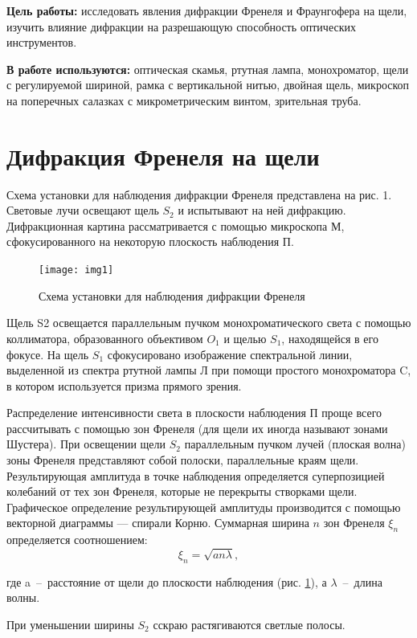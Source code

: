 \documentclass{letask}
\begin{document}


\textbf{Цель работы:} исследовать явления дифракции Френеля и Фраунгофера на щели, изучить влияние дифракции на разрешающую способность оптических инструментов.

\textbf{В работе используются:} оптическая скамья, ртутная лампа, монохроматор, щели с регулируемой шириной, рамка с вертикальной нитью, двойная щель, микроскоп на поперечных салазках с микрометрическим винтом, зрительная труба.

\section{Дифракция Френеля на щели}

Схема установки для наблюдения дифракции Френеля представлена на рис. 1. Световые лучи освещают щель $S_2$ и испытывают на ней дифракцию. Дифракционная картина рассматривается с помощью микроскопа М, сфокусированного на некоторую плоскость наблюдения П.

\begin{figure}[H]
\centering
	\texttt{[image: img1]}
	\caption{Схема установки для наблюдения дифракции Френеля}
	\label{fig:scheme}
\end{figure}


Щель S2 освещается параллельным пучком монохроматического света с помощью коллиматора, образованного объективом $O_1$ и щелью $S_1$, находящейся в его фокусе. На щель $S_1$ сфокусировано изображение спектральной линии, выделенной из спектра ртутной лампы Л при помощи простого монохроматора C, в котором используется призма прямого зрения. 

Распределение интенсивности света в плоскости наблюдения П проще всего рассчитывать с помощью зон Френеля (для щели их иногда называют зонами Шустера). При освещении щели $S_2$ параллельным пучком лучей (плоская волна) зоны Френеля представляют собой полоски, параллельные краям щели. Результирующая амплитуда в точке наблюдения определяется суперпозицией колебаний от тех зон Френеля, которые не перекрыты створками щели. Графическое определение результирующей амплитуды производится с помощью векторной диаграммы — спирали Корню. Суммарная ширина $n$ зон Френеля $\xi_n$ определяется соотношением: 
\[ \xi_n = \sqrt{an\lambda}, \]

где a~--~расстояние от щели до плоскости наблюдения (рис. \ref{fig:scheme}), а $\lambda$~--~длина волны.

При уменьшении ширины $S_2$ сскраю растягиваются светлые полосы.
\end{document}
